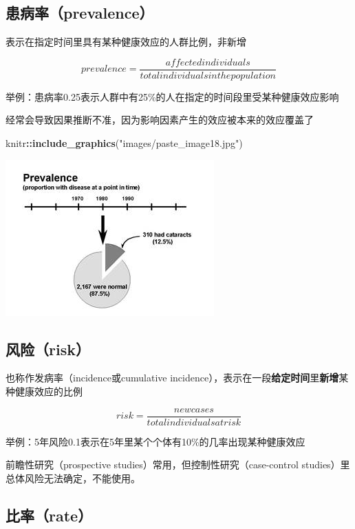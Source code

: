 \documentclass[]{book}
\newenvironment{Shaded}{\begin{snugshade}}{\end{snugshade}}
\newcommand{\KeywordTok}[1]{\textcolor[rgb]{0.13,0.29,0.53}{\textbf{#1}}}
\newcommand{\NormalTok}[1]{#1}
\newcommand{\OperatorTok}[1]{\textcolor[rgb]{0.81,0.36,0.00}{\textbf{#1}}}
\newcommand{\StringTok}[1]{\textcolor[rgb]{0.31,0.60,0.02}{#1}}
\begin{document}
\hypertarget{prevalence}{%
\subsection{患病率（prevalence）}\label{prevalence}}

表示在指定时间里具有某种健康效应的人群比例，非新增

\[prevalence = \frac{affected individuals}{total individuals in the population}\]

举例：患病率0.25表示人群中有25\%的人在指定的时间段里受某种健康效应影响

经常会导致因果推断不准，因为影响因素产生的效应被本来的效应覆盖了

\begin{Shaded}
\begin{Highlighting}[]
\NormalTok{knitr}\OperatorTok{::}\KeywordTok{include_graphics}\NormalTok{(}\StringTok{"images/paste_image18.jpg"}\NormalTok{)}
\end{Highlighting}
\end{Shaded}

\includegraphics{images/paste_image18.jpg}

\hypertarget{risk}{%
\subsection{风险（risk）}\label{risk}}

也称作发病率（incidence或cumulative incidence），表示在一段\textbf{给定时间}里\textbf{新增}某种健康效应的比例

\[risk = \frac{new cases}{total individuals at risk}\]

举例：5年风险0.1表示在5年里某个个体有10\%的几率出现某种健康效应

前瞻性研究（prospective studies）常用，但控制性研究（case-control studies）里总体风险无法确定，不能使用。

\hypertarget{rate}{%
\subsection{比率（rate）}\label{rate}}
\end{document}
